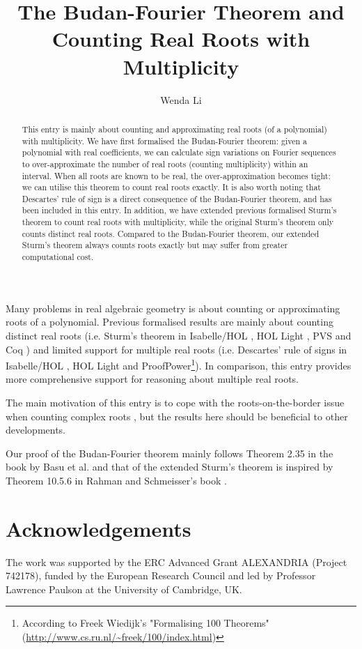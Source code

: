 \documentclass[11pt,a4paper]{article}
\begin{document}
\title{The Budan-Fourier Theorem and Counting Real Roots with Multiplicity}
\author{Wenda Li}
\maketitle

\begin{abstract}
	This entry is mainly about counting and approximating real roots (of a polynomial) with multiplicity.
	We have first formalised the Budan-Fourier theorem: given a polynomial with real coefficients, we can calculate sign variations on Fourier sequences to over-approximate the number of real roots (counting multiplicity) within an interval. When all roots are known to be real, the over-approximation becomes tight: we can utilise this theorem to count real roots exactly. It is also worth noting that Descartes' rule of sign is a direct consequence of the Budan-Fourier theorem, and has been included in this entry. In addition, we have extended previous formalised Sturm's theorem to count real roots with multiplicity, while the original Sturm's theorem only counts distinct real roots. Compared to the Budan-Fourier theorem, our extended Sturm's theorem always counts roots exactly but may suffer from greater computational cost.
\end{abstract}

Many problems in real algebraic geometry is about counting or approximating roots of a polynomial. Previous formalised results are mainly about counting distinct real roots (i.e. Sturm's theorem in Isabelle/HOL \cite{Sturm_Tarski-AFP,Sturm_Sequences-AFP}, HOL Light \cite{harrison-poly}, PVS \cite{Narkawicz:2015do} and Coq \cite{Mahboubi:2012gg}) and limited support for multiple real roots (i.e. Descartes' rule of signs in Isabelle/HOL \cite{Descartes_Sign_Rule-AFP}, HOL Light and ProofPower\footnote{According to Freek Wiedijk's "Formalising 100 Theorems" (\url{http://www.cs.ru.nl/~freek/100/index.html})}). In comparison, this entry provides more comprehensive support for reasoning about multiple real roots.

The main motivation of this entry is to cope with the roots-on-the-border issue when counting complex roots \cite{li_evaluate_cauchy,Count_Complex_Roots-AFP}, but the results here should be beneficial to other developments.

Our proof of the Budan-Fourier theorem mainly follows Theorem 2.35 in the book by Basu et al. \cite{Basu:2006bo} and that of the extended Sturm's theorem is inspired by Theorem 10.5.6 in Rahman and Schmeisser's book \cite{Rahman:2016us}.




\section{Acknowledgements}
The work was supported by the ERC Advanced Grant ALEXANDRIA (Project 742178), funded by the European Research Council
and led by Professor Lawrence Paulson at the University of Cambridge, UK.



\end{document}
